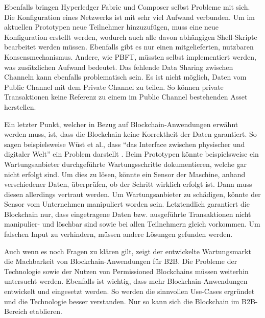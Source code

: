Ebenfalls bringen Hyperledger Fabric und Composer selbst Probleme mit sich. Die Konfiguration eines Netzwerks ist mit sehr viel Aufwand verbunden. Um im aktuellen Prototypen neue Teilnehmer hinzuzufügen, muss eine neue Konfiguration erstellt werden, wodurch auch alle davon abhängigen Shell-Skripte bearbeitet werden müssen. Ebenfalls gibt es nur einen mitgelieferten, nutzbaren Konsensmechanismus. Andere, wie \acs{PBFT}, müssten selbst implementiert werden, was zusätzlichen Aufwand bedeutet. Das fehlende Data Sharing zwischen Channeln kann ebenfalls problematisch sein. Es ist nicht möglich, Daten vom Public Channel mit dem Private Channel zu teilen. So können private Transaktionen keine Referenz zu einem im Public Channel bestehenden Asset herstellen.

Ein letzter Punkt, welcher in Bezug auf Blockchain-Anwendungen erwähnt werden muss, ist, dass die Blockchain keine Korrektheit der Daten garantiert. So sagen beispielsweise Wüst et al., dass ``das Interface zwischen physischer und digitaler Welt'' ein Problem darstellt \cite{WustyouneedBlockchain2017}. Beim Prototypen könnte beispielsweise ein Wartungsanbieter durchgeführte Wartungsschritte dokumentieren, welche gar nicht erfolgt sind. Um dies zu lösen, könnte ein Sensor der Maschine, anhand verschiedener Daten, überprüfen, ob der Schritt wirklich erfolgt ist. Dann muss diesen allerdings vertraut werden. Um Wartungsanbieter zu schädigen, könnte der Sensor vom Unternehmen manipuliert worden sein. Letztendlich garantiert die Blockchain nur, dass eingetragene Daten bzw. ausgeführte Transaktionen nicht manipulier- und löschbar sind sowie bei allen Teilnehmern gleich vorkommen. Um falschen Input zu verhindern, müssen andere Lösungen gefunden werden.

Auch wenn es noch Fragen zu klären gilt, zeigt der entwickelte Wartungsmarkt die Machbarkeit von Blockchain-Anwendungen für \acs{B2B}. Die Probleme der Technologie sowie der Nutzen von Permissioned Blockchains müssen weiterhin untersucht werden. Ebenfalls ist wichtig, dass mehr Blockchain-Anwendungen entwickelt und eingesetzt werden. So werden die sinnvollen Use-Cases ergründet und die Technologie besser verstanden. Nur so kann sich die Blockchain im B2B-Bereich etablieren.


